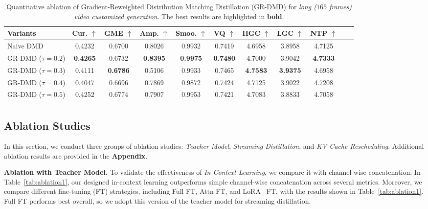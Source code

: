 \begin{table}[!t]
\centering
\caption{
Quantitative ablation of Gradient-Reweighted Distribution Matching Distillation (GR-DMD) for \textit{long ($165$ frames) video customized generation}. The best results are highlighted in \textbf{bold}.
}
\setlength{\tabcolsep}{2.5pt}
\begin{tabular}{l c ccccccccc}
\toprule
Variants & Cur. $\uparrow$ & GME $\uparrow$ & Amp. $\uparrow$ & Smoo. $\uparrow$ & VQ $\uparrow$ & HGC $\uparrow$ & LGC $\uparrow$ & NTP $\uparrow$ \\
\midrule
Naive DMD           & 0.4232 & 0.6700 & 0.8026 & 0.9932 & 0.7419 & 4.6958 & 3.8958 & 4.7125  \\
\rowcolor{gray!25}
GR-DMD ($\tau=0.2$) & \textbf{0.4265} & 0.6732 & \textbf{0.8395} & \textbf{0.9975} & \textbf{0.7480} & 4.7000 & 3.9042 & \textbf{4.7333}  \\
GR-DMD ($\tau=0.3$) & 0.4111 & \textbf{0.6786} & 0.5106 & 0.9933 & 0.7465 & \textbf{4.7583} & \textbf{3.9375} & 4.6958  \\
GR-DMD ($\tau=0.4$) & 0.4047 & 0.6696 & 0.7869 & 0.9872 & 0.7424 & 4.7125 & 3.9022 & 4.7208  \\
GR-DMD ($\tau=0.5$) & 0.4252 & 0.6774 & 0.7907 & 0.9953 & 0.7421 & 4.7083 & 3.8833 & 4.7058  \\
\bottomrule
\label{tab:ablation2}
\vspace{-1.0em}
\end{tabular}
\end{table}



\subsection{Ablation Studies}
%
In this section, we conduct three groups of ablation studies: \textit{Teacher Model}, \textit{Streaming Distillation}, and \textit{KV Cache Rescheduling}.
% 
Additional ablation results are provided in the \textbf{Appendix}.



\noindent
\textbf{Ablation with Teacher Model.}
% 
To validate the effectiveness of \textit{In-Context Learning}, we compare it with channel-wise concatenation.
In Table~\ref{tab:ablation1}, our designed in-context learning outperforms simple channel-wise concatenation across several metrics.
% 
Moreover, we compare different fine-tuning (FT) strategies, including Full FT, Attn FT, and LoRA~\cite{hu2022lora} FT, with the results shown in Table~\ref{tab:ablation1}.
% 
Full FT performs best overall, so we adopt this version of the teacher model for streaming distillation.



